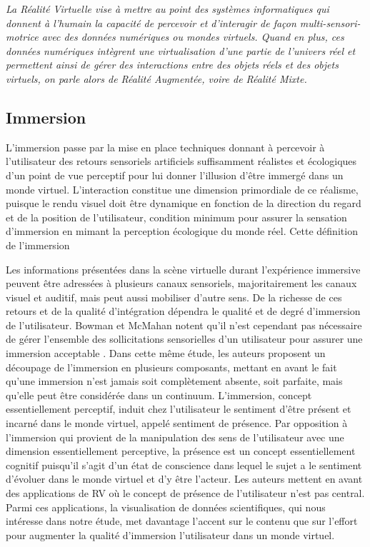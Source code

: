 \textit{La Réalité Virtuelle vise à mettre au point des systèmes informatiques qui donnent à l'humain la capacité de percevoir et d’interagir de façon multi-sensori-motrice avec des données numériques ou mondes virtuels. Quand en plus, ces données numériques intègrent une virtualisation d’une partie de l’univers réel et permettent ainsi de gérer des interactions entre des objets réels et des objets virtuels, on parle alors de Réalité Augmentée, voire de Réalité Mixte.
}

\subsection{Immersion}

L'immersion passe par la mise en place techniques donnant à percevoir à l'utilisateur des retours sensoriels artificiels suffisamment réalistes et écologiques d'un point de vue perceptif pour lui donner l'illusion d'être immergé dans un monde virtuel. L'interaction constitue une dimension primordiale de ce réalisme, puisque le rendu visuel doit être dynamique en fonction de la direction du regard et de la position de l'utilisateur, condition minimum pour assurer la sensation d'immersion en mimant la perception écologique du monde réel. Cette définition de l'immersion 




Les informations présentées dans la scène virtuelle durant l'expérience  immersive peuvent être adressées à plusieurs canaux sensoriels, majoritairement les canaux visuel et auditif, mais peut aussi mobiliser d'autre sens. De la richesse de ces retours et de la qualité d'intégration dépendra le qualité et de degré d'immersion de l'utilisateur. Bowman et McMahan notent qu'il n'est cependant pas nécessaire de gérer l'ensemble des sollicitations sensorielles d'un utilisateur pour assurer une immersion acceptable \cite{bowman_virtual_2007}. Dans cette même étude, les auteurs proposent un découpage de l'immersion en plusieurs composants, mettant en avant le fait qu'une immersion n'est jamais soit complètement absente, soit parfaite, mais qu'elle peut être considérée dans un continuum. L'immersion, concept essentiellement perceptif, induit chez l'utilisateur le sentiment d'être présent et incarné dans le monde virtuel, appelé sentiment de présence. Par opposition à l'immersion qui provient de la manipulation des sens de l'utilisateur avec une dimension essentiellement perceptive, la présence est un concept essentiellement cognitif puisqu'il s'agit d'un état de conscience dans lequel le sujet a le sentiment d'évoluer dans le monde virtuel et d'y être l'acteur. Les auteurs mettent en avant des applications de RV où le concept de présence de l'utilisateur n'est pas central. Parmi ces applications, la visualisation de données scientifiques, qui nous intéresse dans notre étude, met davantage l'accent sur le contenu que sur l'effort pour augmenter la qualité d'immersion l'utilisateur dans un monde virtuel.

